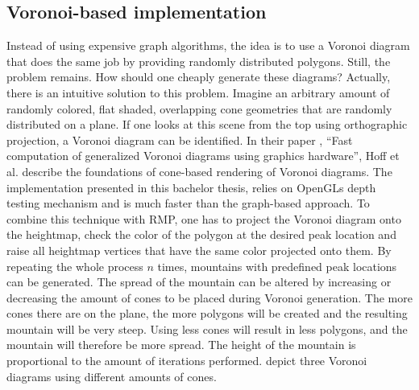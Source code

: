 \documentclass[11pt,a4paper,twoside,openright]{report}
\begin{document}
\subsection{Voronoi-based implementation}
\label{subsec:voronoibasedimpl}
Instead of using expensive graph algorithms, the idea is to use a Voronoi diagram that does the same job by providing randomly distributed polygons. Still, the problem remains. How should one cheaply generate these diagrams? Actually, there is an intuitive solution to this problem. Imagine an arbitrary amount of randomly colored, flat shaded, overlapping cone geometries that are randomly distributed on a plane. If one looks at this scene from the top using orthographic projection, a Voronoi diagram can be identified. In their paper \cite{hoff1999fast}, ``Fast computation of generalized Voronoi diagrams using graphics hardware'', Hoff et al. describe the foundations of cone-based rendering of Voronoi diagrams. The implementation presented in this bachelor thesis, relies on OpenGLs depth testing mechanism and is much faster than the graph-based approach. To combine this technique with RMP, one has to project the Voronoi diagram onto the heightmap, check the color of the polygon at the desired peak location and raise all heightmap vertices that have the same color projected onto them. By repeating the whole process $n$ times, mountains with predefined peak locations can be generated. The spread of the mountain can be altered by increasing or decreasing the amount of cones to be placed during Voronoi generation. The more cones there are on the plane, the more polygons will be created and the resulting mountain will be very steep. Using less cones will result in less polygons, and the mountain will therefore be more spread. The height of the mountain is proportional to the amount of iterations performed.  depict three Voronoi diagrams using different amounts of cones.
\end{document}
